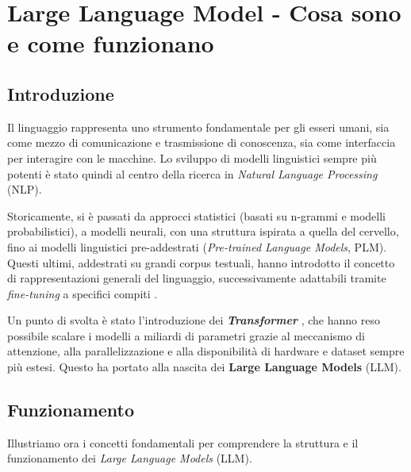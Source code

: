 ﻿\chapter{Large Language Model - Cosa sono e come funzionano}


\section{Introduzione}

Il linguaggio rappresenta uno strumento fondamentale per gli esseri umani, sia come mezzo di comunicazione e trasmissione di conoscenza,
sia come interfaccia per interagire con le macchine. Lo sviluppo di modelli linguistici sempre più potenti è stato quindi al centro
della ricerca in \textit{Natural Language Processing} (NLP).

Storicamente, si è passati da approcci statistici (basati su n-grammi e modelli probabilistici), a modelli neurali, con una struttura ispirata
a quella del cervello, fino ai modelli linguistici pre-addestrati (\textit{Pre-trained Language Models}, PLM).
Questi ultimi, addestrati su grandi corpus testuali, hanno introdotto il concetto di rappresentazioni generali del linguaggio,
successivamente adattabili tramite \textit{fine-tuning} a specifici compiti \cite{devlin2019bert}\cite{peters2018elmo}\cite{lewis2019bart}.

Un punto di svolta è stato l'introduzione dei \textbf{\textit{Transformer}} \cite{chernyavskiy2021transformers},
che hanno reso possibile scalare i modelli a miliardi di parametri grazie al meccanismo di attenzione,
alla parallelizzazione e alla disponibilità di hardware e dataset sempre più estesi.
Questo ha portato alla nascita dei \textbf{Large Language Models} (LLM).

\newpage
\section{Funzionamento}

Illustriamo ora i concetti fondamentali per comprendere
la struttura e il funzionamento dei \textit{Large Language Models} (LLM).

